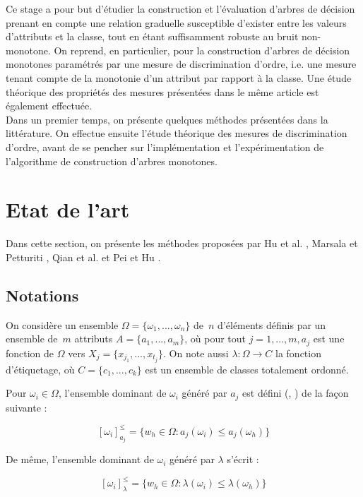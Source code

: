 \documentclass[a4paper]{article}
\begin{document}
Ce stage a pour but d'étudier la construction et l'évaluation d'arbres de
décision prenant en compte une relation graduelle susceptible d'exister entre
les valeurs d'attributs et la classe, tout en étant suffisamment robuste au
bruit non-monotone. On reprend, en particulier, \cite{marsala-rank} pour la
construction d'arbres de décision monotones paramétrés par une mesure de
discrimination d'ordre, i.e. une mesure tenant compte de la monotonie d'un
attribut par rapport à la classe. Une étude théorique des propriétés des mesures
présentées dans le même article est également effectuée.\\

Dans un premier temps, on présente quelques méthodes présentées dans la
littérature. On effectue ensuite l'étude théorique des mesures de
discrimination d'ordre, avant de se pencher sur l'implémentation et
l'expérimentation de l'algorithme de construction d'arbres monotones. \\

\section{Etat de l'art} 
Dans cette section, on présente les méthodes proposées par Hu et al.
\cite{hu-rank}, Marsala et Petturiti \cite{marsala-rank}, Qian et al.
\cite{qian-fusing} et Pei et Hu \cite{pei-partially}.

\subsection{Notations}
On considère un ensemble $\Omega = \{\omega_1,...,\omega_n\}$ de~$n$ d'éléments définis
par un ensemble de~$m$ attributs $A = \{a_1,...,a_m\}$, où pour tout $j=1,...,m, a_j$
est une fonction de $\Omega$ vers $X_j = \{x_{j_1},...,x_{t_j}\}$. On note aussi
$\lambda: \Omega \rightarrow C$ la fonction d'étiquetage, où $C =
\{c_1,...,c_k\}$ est un ensemble de classes totalement ordonné.

Pour $\omega_i \in \Omega$, l'ensemble dominant de $\omega_i$ généré par $a_j$
est défini (\cite{greco-roughappr}, \cite{greco-roughsets}) de la façon suivante :

$$[\omega_i]^{\leq}_{a_j} = \{w_h \in \Omega : a_j(\omega_i) \leq a_j(\omega_h)\}$$

De même, l'ensemble dominant de $\omega_i$ généré par $\lambda$ s'écrit :

$$[\omega_i]^{\leq}_{\lambda} = \{w_h \in \Omega : \lambda(\omega_i) \leq
\lambda(\omega_h)\}$$ 
\end{document}
